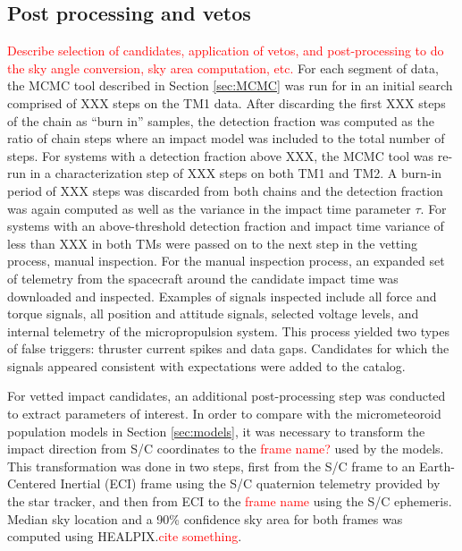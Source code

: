 \documentclass[twocolumn, trackchanges]{aastex61}
\newcommand{\red}[1]{\textcolor{red}{#1}}
\begin{document}
\FloatBarrier
\subsection{Post processing and vetos}\label{sec:vetos}
\red{Describe selection of candidates, application of vetos, and post-processing to do the sky angle conversion, sky area computation, etc.}
For each segment of data, the MCMC tool described in Section \ref{sec:MCMC} was run for in an initial search comprised of XXX steps on the TM1 data. After discarding the first XXX steps of the chain as ``burn in'' samples, the detection fraction was computed as the ratio of chain steps where an impact model was included to the total number of steps.  For systems with a detection fraction above XXX, the MCMC tool was re-run in a characterization step of XXX steps on both TM1 and TM2. A burn-in period of XXX steps was discarded from both chains and the detection fraction was again computed as well as the variance in the impact time parameter $\tau$.  For systems with an above-threshold detection fraction and impact time variance of less than XXX in both TMs were passed on to the next step in the vetting process, manual inspection.  For the manual inspection process, an expanded set of telemetry from the spacecraft around the candidate impact time was downloaded and inspected.  Examples of signals inspected include all force and torque signals, all position and attitude signals, selected voltage levels, and internal telemetry of the micropropulsion system. This process yielded two types of false triggers: thruster current spikes and data gaps. Candidates for which the signals appeared consistent with expectations were added to the catalog.

For vetted impact candidates, an additional post-processing step was conducted to extract parameters of interest.  In order to compare with the micrometeoroid population models in Section \ref{sec:models}, it was necessary to transform the impact direction from S/C coordinates to the \red{frame name?} used by the models.  This transformation was done in two steps, first from the S/C frame to an Earth-Centered Inertial (ECI) frame using the S/C quaternion telemetry provided by the star tracker, and then from ECI to the \red{frame name} using the S/C ephemeris. Median sky location and a 90\% confidence sky area for both frames was computed using HEALPIX.\red{cite something}.

\FloatBarrier
\end{document}
